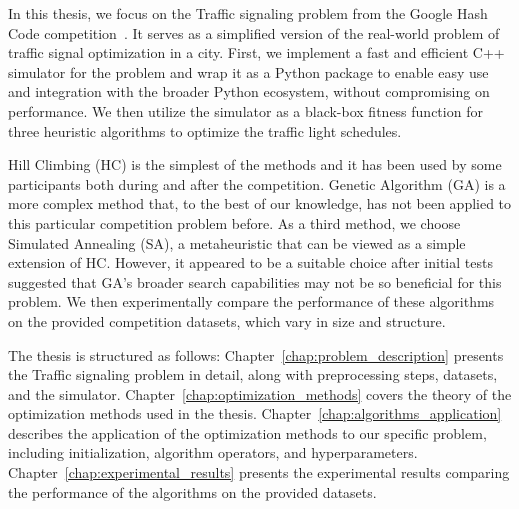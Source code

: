 In this thesis, we focus on the Traffic signaling problem from the Google Hash Code competition~\cite{google2023google}. It serves as a simplified version of the real-world problem of traffic signal optimization in a city. First, we implement a fast and efficient C++ simulator for the problem and wrap it as a Python package to enable easy use and integration with the broader Python ecosystem, without compromising on performance.
We then utilize the simulator as a black-box fitness function for three heuristic algorithms to optimize the traffic light schedules.

Hill Climbing (HC) is the simplest of the methods and it has been used by some participants both during and after the competition.
Genetic Algorithm (GA) is a more complex method that, to the best of our knowledge, has not been applied to this particular competition problem before.
As a third method, we choose Simulated Annealing (SA), a metaheuristic that can be viewed as a simple extension of HC. However, it appeared to be a suitable choice after initial tests suggested that GA's broader search capabilities may not be so beneficial for this problem.
We then experimentally compare the performance of these algorithms on the provided competition datasets, which vary in size and structure.

The thesis is structured as follows:
Chapter~\ref{chap:problem_description} presents the Traffic signaling problem in detail, along with preprocessing steps, datasets, and the simulator.
Chapter~\ref{chap:optimization_methods} covers the theory of the optimization methods used in the thesis.
Chapter~\ref{chap:algorithms_application} describes the application of the optimization methods to our specific problem, including initialization, algorithm operators, and hyperparameters.
Chapter~\ref{chap:experimental_results} presents the experimental results comparing the performance of the algorithms on the provided datasets.
